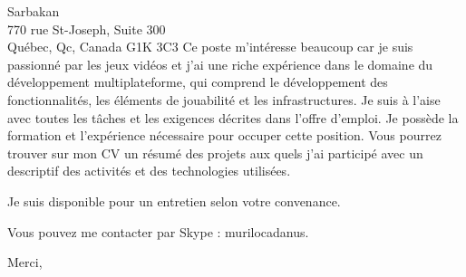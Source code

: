 \documentclass[11pt]{letter} %
\begin{document}
\begin{letter}{%
Sarbakan \\
770 rue St-Joseph, Suite 300 \\
Québec, Qc, Canada G1K 3C3}
Ce poste m'intéresse beaucoup car je suis passionné par les jeux vidéos et j'ai une riche expérience dans le domaine du développement multiplateforme, qui comprend le développement des fonctionnalités, les éléments de jouabilité et les infrastructures. Je suis à l'aise avec toutes les tâches et les exigences décrites dans l'offre d'emploi. Je possède la formation et l'expérience nécessaire pour occuper cette position. Vous pourrez trouver sur mon CV un résumé des projets aux quels j'ai participé avec un descriptif des activités et des technologies utilisées.

Je suis disponible pour un entretien selon votre convenance.

Vous pouvez me contacter par Skype : murilocadanus.

\closing{Merci, }


\end{letter}
\end{document}
